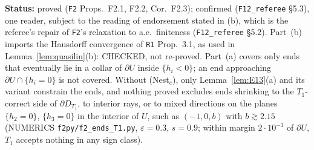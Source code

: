 \documentclass[11pt]{article}
\theoremstyle{definition}
\theoremstyle{remark}
\newcommand{\src}[1]{\texttt{#1}}
\newcommand{\status}[1]{\par\smallskip\noindent\textbf{Status:} #1\par\smallskip}
\begin{document}
\status{proved (\src{F2} Props.~F2.1, F2.2, Cor.~F2.3); confirmed (\src{F12\_referee} \S5.3), one reader, subject to the reading of endorsement stated in (b), which is the referee's repair of \src{F2}'s relaxation to a.e.\ finiteness (\src{F12\_referee} \S5.2). Part~(b) imports the Hausdorff convergence of \src{R1} Prop.~3.1, as used in Lemma~\ref{lem:quasilin}(b): CHECKED, not re-proved. Part~(a) covers only ends that eventually lie in a collar of $\partial U$ inside $\{h_i<0\}$; an end approaching $\partial U\cap\{h_i=0\}$ is not covered. Without (Nest$_e$), only Lemma~\ref{lem:E13}(a) and its variant constrain the ends, and nothing proved excludes ends shrinking to the $T_1$-correct side of $\partial D_{T_1}$, to interior rays, or to mixed directions on the planes $\{h_2=0\}$, $\{h_3=0\}$ in the interior of $U$, such as $(-1,0,b)$ with $b\gtrsim2.15$ (NUMERICS \src{f2py/f2\_ends\_T1.py}, $\varepsilon=0.3$, $s=0.9$; within margin $2\cdot10^{-3}$ of $\partial U$, $T_1$ accepts nothing in any sign class).}
\end{document}
